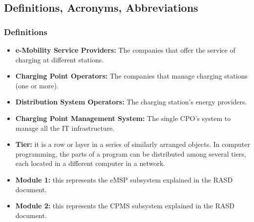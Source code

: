 \subsection{Definitions, Acronyms, Abbreviations}
\subsubsection{Definitions}
\begin{itemize}
    \item \textbf{e-Mobility Service Providers:} The companies that offer the service of charging at different stations.
    \item \textbf{Charging Point Operators:} The companies that manage charging stations (one or more).\label{CPO}
    \item \textbf{Distribution System Operators:} The charging station's energy providers.\label{DSO}
    \item \textbf{Charging Point Management System:} The single CPO's system to manage all the IT infrastructure.
    \item \textbf{Tier:} it is a row or layer in a series of similarly arranged objects. In computer programming, the parts of a program can be distributed among several tiers, each located in a different computer in a network.
    \item \textbf{Module 1:} this represents the eMSP subsystem explained in the RASD document.
    \item \textbf{Module 2:} this represents the CPMS subsystem explained in the RASD document.
\end{itemize}

